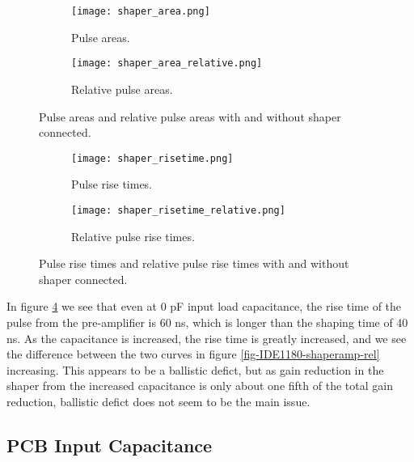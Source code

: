 \documentclass[../main/thesis.tex]{subfiles}
\begin{document}
\begin{figure}
	\centering
	\begin{subfigure}{.5\textwidth}
		\centering
		\texttt{[image: shaper\_area.png]}
		\caption{Pulse areas.}
		\label{fig-IDE1180-shaperarea-}
	\end{subfigure}%
	\begin{subfigure}{.5\textwidth}
		\centering
		\texttt{[image: shaper\_area\_relative.png]}
		\caption{Relative pulse areas.}
		\label{fig-IDE1180-shaperarea-rel} %
	\end{subfigure}
	\caption{Pulse areas and relative pulse areas with and without shaper connected.}
	\label{fig-IDE1180-shaperarea}
\end{figure}

\begin{figure}
	\centering
	\begin{subfigure}{.5\textwidth}
		\centering
		\texttt{[image: shaper\_risetime.png]}
		\caption{Pulse rise times.}
		\label{fig-IDE1180-shaperrisetime-}
	\end{subfigure}%
	\begin{subfigure}{.5\textwidth}
		\centering
		\texttt{[image: shaper\_risetime\_relative.png]}
		\caption{Relative pulse rise times.}
		\label{fig-IDE1180-shaperrisetime-rel} %
	\end{subfigure}
	\caption{Pulse rise times and relative pulse rise times with and without shaper connected.}
	\label{fig-IDE1180-shaperrisetime}
\end{figure}

In figure \ref{fig-IDE1180-shaperrisetime-} we see that even at 0 pF input load capacitance, the rise time of the pulse from the pre-amplifier is 60 ns, which is longer than the shaping time of 40 ns. As the capacitance is increased, the rise time is greatly increased, and we see the difference between the two curves in figure \ref{fig-IDE1180-shaperamp-rel} increasing. This appears to be a ballistic defict, but as gain reduction in the shaper from the increased capacitance is only about one fifth of the total gain reduction, ballistic defict does not seem to be the main issue.  

\subsection{PCB Input Capacitance}
\label{ide-gain-pcb}
\end{document}

